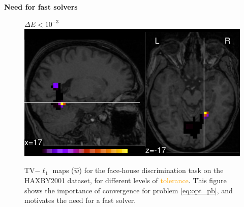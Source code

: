\documentclass[french]{STIC_poster}
\begin{document}
\begin{frame}[t]
\begin{columns}[t]
\begin{column}{.48\linewidth}
\begin{nbox}[\textwidth]{\textbf{Need for fast solvers}}
\begin{figure}
{{{                                          $\Delta E < 10^{-3}$}}\hspace*{.315\linewidth}}\hfill%
                                    \includegraphics[width=.32\linewidth]{maps/face_vs_house_tol_1e-05.pdf}%
                                    \caption{TV$-\ell_1$ maps ($\hat{w}$) for the face-house discrimination task on
                                      the HAXBY2001 dataset, for different levels of \textcolor{orange}{tolerance}.
                                      This figure shows the importance of convergence for problem \eqref{eq:opt_pb}, and motivates
                                      the need for a fast solver.}%
                                    \label{fig:maps_tolerance}
                                  \end{figure}

				\end{nbox}
			\end{column}
			\hfill
		\end{columns}
	\end{frame}

 
\end{document}
